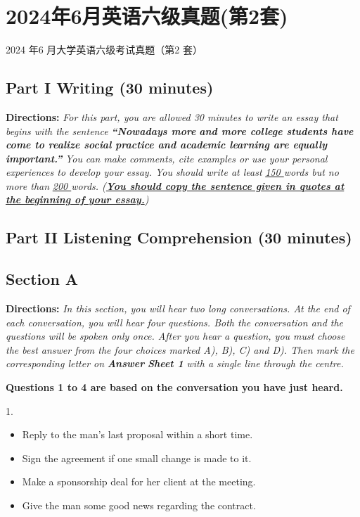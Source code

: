 \documentclass[UTF8,11pt]{ctexart}
\begin{document}
\section*{2024年6月英语六级真题(第2套)}
2024 年6 月大学英语六级考试真题（第2 套）


\subsection*{\textbf{Part I Writing} \textbf{(30 minutes)}}


\textbf{Directions:}\textit{ For this part, you are allowed 30 minutes to write an essay that begins with the sentence }\textbf{\textit{“Nowadays more}} \textbf{\textit{and more college students have come to realize social practice and academic learning are equally important.”}}\textit{ You} \textit{can make comments, cite examples or use your personal experiences to develop your essay. You should write at least} \textit{\uline{150 }}\textit{words but no more than }\textit{\uline{200 }}\textit{words. (}\textbf{\textit{\uline{You should copy the sentence given in quotes at the beginning of your essay.}}}\textit{)}


\subsection*{\textbf{Part II} \textbf{Listening Comprehension} \textbf{(30 minutes)}}


\subsection*{\textbf{Section A}}


\textbf{Directions:} \textit{In this section, you will hear two long conversations. At the end of each conversation, you will hear four} \textit{questions. Both the conversation and the questions will be spoken only once. After you hear a question, you must} \textit{choose the best answer from the four choices marked A), B), C) and D). Then mark the corresponding letter on }\textbf{\textit{Answer}} \textbf{\textit{Sheet 1}}\textit{ with a single line through the centre.}


\textbf{Questions 1 to 4 are based on the conversation you have just heard.}


1.


\begin{itemize}[leftmargin=2em,itemsep=.2em,topsep=.4em]\item[A.] Reply to the man’s last proposal within a short time.
\item[B.] Sign the agreement if one small change is made to it.
\item[C.] Make a sponsorship deal for her client at the meeting.
\item[D.] Give the man some good news regarding the contract.
\end{itemize}
\end{document}
